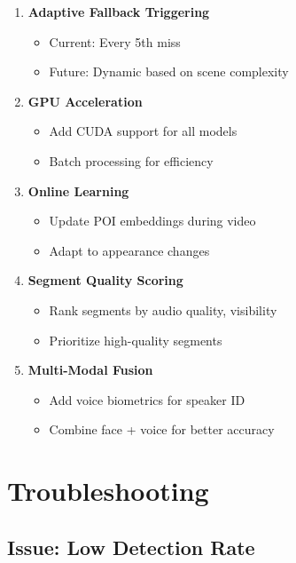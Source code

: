 \documentclass[11pt,a4paper]{article}
\begin{document}
\begin{enumerate}
    \item \textbf{Adaptive Fallback Triggering}
    \begin{itemize}
        \item Current: Every 5th miss
        \item Future: Dynamic based on scene complexity
    \end{itemize}
    
    \item \textbf{GPU Acceleration}
    \begin{itemize}
        \item Add CUDA support for all models
        \item Batch processing for efficiency
    \end{itemize}
    
    \item \textbf{Online Learning}
    \begin{itemize}
        \item Update POI embeddings during video
        \item Adapt to appearance changes
    \end{itemize}
    
    \item \textbf{Segment Quality Scoring}
    \begin{itemize}
        \item Rank segments by audio quality, visibility
        \item Prioritize high-quality segments
    \end{itemize}
    
    \item \textbf{Multi-Modal Fusion}
    \begin{itemize}
        \item Add voice biometrics for speaker ID
        \item Combine face + voice for better accuracy
    \end{itemize}
\end{enumerate}

\section{Troubleshooting}

\subsection{Issue: Low Detection Rate}
\end{document}
